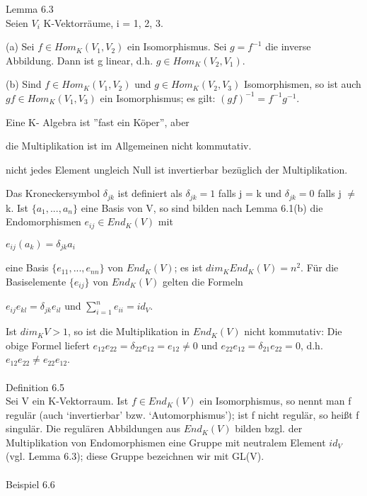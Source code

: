 \documentclass[fontsize=10pt]{scrartcl}
\begin{document}
Lemma 6.3\\
Seien $V_i$ K-Vektorräume, i = 1, 2, 3.
\begin{compactenum}
\item[(a)] Sei $f \in Hom_K(V_1,V_2)$ ein Isomorphismus. Sei $g = f^{-1}$ die inverse Abbildung. Dann ist g linear, d.h. $g \in Hom_K(V_2,V_1)$.
\item[(b)] Sind $f \in Hom_K(V_1,V_2)$ und $g \in Hom_K(V_2,V_3)$ Isomorphismen, so ist auch $gf \in Hom_K(V_1,V_3)$ ein Isomorphismus; es gilt: $(gf)^{-1} = f^{-1}g^{-1}$.
\end{compactenum}
Eine K- Algebra ist ”fast ein Köper”, aber
\begin{compactitem}
\item die Multiplikation ist im Allgemeinen nicht kommutativ.
\item nicht jedes Element ungleich Null ist invertierbar bezüglich der Multiplikation.\\
\end{compactitem}
Das Kroneckersymbol $\delta_{jk}$ ist definiert als $\delta_{jk} = 1$ falls j = k und $\delta_{jk} = 0$ falls j $\neq$ k. Ist $\{a_1,... ,a_n\}$ eine Basis von V, so sind bilden nach Lemma 6.1(b) die Endomorphismen $e_{ij} \in End_K (V)$ mit
\begin{center}
$e_{ij}(a_k) = \delta_{jk}a_i$
\end{center}
eine Basis $\{e_{11}, ..., e_{nn}\}$ von $End_K (V)$; es ist $dim_K End_K (V) = n^2$. Für die Basiselemente $\{e_{ij}\}$ von $End_K(V)$ gelten die Formeln
\begin{center}
$e_{ij}e_{kl} = \delta_{jk}e_{il}$ und $\sum\nolimits_{i=1}^{n}e_{ii} = id_V$.
\end{center}
Ist $dim_K V > 1$, so ist die Multiplikation in $End_K (V)$ nicht kommutativ: Die obige Formel liefert $e_{12}e_{22} = \delta_{22}e_{12} = e_{12} \neq 0$ und $e_{22}e_{12} = \delta_{21}e_{22} = 0$, d.h. $e_{12}e_{22} \neq e_{22}e_{12}$.\\
\\
Definition 6.5\\
Sei V ein K-Vektorraum. Ist $f \in End_K(V)$ ein Isomorphismus, so nennt man f regulär (auch ‘invertierbar’ bzw. ‘Automorphismus’); ist f nicht regulär, so heißt f singulär. Die regulären Abbildungen aus $End_K (V)$ bilden bzgl. der Multiplikation von Endomorphismen eine Gruppe mit neutralem Element $id_V$ (vgl. Lemma 6.3); diese Gruppe bezeichnen wir mit GL(V).\\
\\
Beispiel 6.6\\
\end{document}
